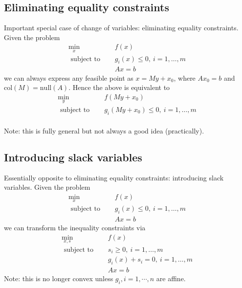\documentclass[a4paper]{article}
\begin{document}
{\subsection{Eliminating equality constraints}
Important special case of change of variables: eliminating equality constraints. Given the problem 
\begin{equation}
  \begin{array}{ll}
    \min\limits_{x} & \quad f(x)  \\
    \text { subject to } &\quad g_{i}(x)\leq 0, \ i=1, \ldots, m \\ \nonumber
    & \quad Ax = b
\end{array}
\end{equation}
we can always express any feasible point as $x = My + x_0$, where $Ax_0 = b$ and $\text{col}(M) = \text{null}(A)$. Hence the above is equivalent to 
\begin{equation}
  \begin{array}{ll}
    \min\limits_{y} & \quad f(My + x_0)  \\
    \text { subject to } &\quad g_{i}(My + x_0)\leq 0, \ i=1, \ldots, m \\ \nonumber
\end{array}
\end{equation}

Note: this is fully general but not always a good idea (practically).

\subsection{Introducing slack variables}
Essentially opposite to eliminating equality constraints: introducing slack variables. Given the problem
\begin{equation}
  \begin{array}{ll}
    \min\limits_{x} & \quad f(x)  \\
    \text { subject to } &\quad g_{i}(x)\leq 0, \ i=1, \ldots, m \\ \nonumber
    & \quad Ax = b
\end{array}
\end{equation}
we can transform the inequality constraints via
\begin{equation}
  \begin{array}{ll}
    \min\limits_{x, s} & \quad f(x)  \\
    \text { subject to } & \quad s_i \geq 0, \ i=1, \ldots, m \\ \nonumber
    & \quad g_{i}(x) + s_i = 0, \ i=1, \ldots, m \\
    & \quad Ax = b
\end{array}
\end{equation}
Note: this is no longer convex unless $g_i, i= 1, \cdots, n$ are affine.

}
\end{document}

